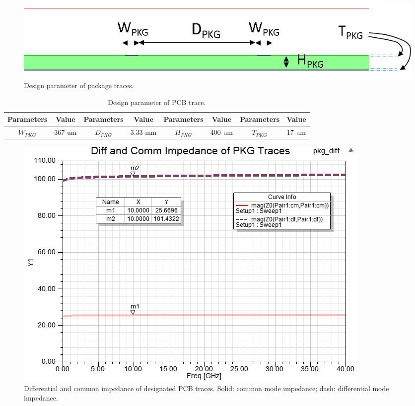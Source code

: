 \documentclass{book}  %
\begin{document}
\begin{paper}
\begin{figure}[htbp!]
	\centering
	\includegraphics[width=0.8\columnwidth]{./img/PCB/differential_PKG_2D_CrossSection.png}
	\caption{Design parameter of package traces.}
	\label{fig:pkg_trace} %
\end{figure}

\begin{table}[htbp!]
	\renewcommand{\arraystretch}{1.3}	
	\begin{center}
		\begin{tabular}{| c | c | c | c | c | c | c | c |}
			\hline
			Parameters  & Value  & Parameters & Value  & Parameters & Value  & Parameters & Value \\ \hline
			$W_{PKG}$   & 367 um & $D_{PKG}$  & 3.33 mm& $H_{PKG}$  & 400 um & $T_{PKG}$  & 17 um \\
			\hline
		\end{tabular}
	\end{center}
	\label{table:pkg_trace}
	\caption{Design parameter of PCB trace.}
	\vskip0.2in
\end{table}

\begin{figure}[htbp!]
	\centering
	\includegraphics[width=0.8\columnwidth]{./img/PCB/differential_PKG_2D_impedance.png}
	\caption{Differential and common impedance of designated PCB traces. Solid: common mode impedance; dash: differential mode impedance.}
	\label{fig:pkg_trace_impedance} %
\end{figure}




\end{paper}
\end{document}
